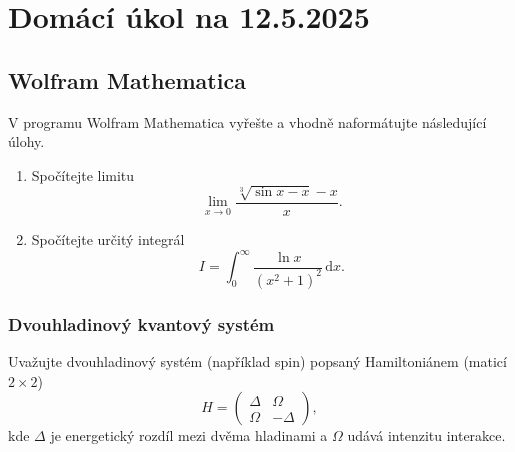 \documentclass[a4paper,11pt,twoside]{article}
\renewcommand{\d}{\mathrm{d}}
\begin{document}
\section*{Domácí úkol na 12.5.2025}
\subsection*{Wolfram Mathematica}

V programu Wolfram Mathematica vyřešte a vhodně naformátujte následující úlohy.

\begin{enumerate}
    \item
    Spočítejte limitu
    \begin{equation*}
        \lim_{x\rightarrow 0}\frac{\sqrt[3]{\sin{x}-x}-x}{x}.
    \end{equation*}

    \item
    Spočítejte určitý integrál
    \begin{equation*}
        I=\int_{0}^{\infty}\frac{\ln{x}}{\left(x^2+1\right)^2}\,\d x.
    \end{equation*}
\end{enumerate}

\subsubsection*{Dvouhladinový kvantový systém}

Uvažujte dvouhladinový systém (například spin) popsaný Hamiltoniánem (maticí $2\times2$)
\begin{equation*}
    H=\begin{pmatrix}
        \Delta & \Omega \\
        \Omega & -\Delta
    \end{pmatrix},
\end{equation*}
kde $\Delta$ je energetický rozdíl mezi dvěma hladinami a $\Omega$ udává intenzitu interakce.
\end{document}
